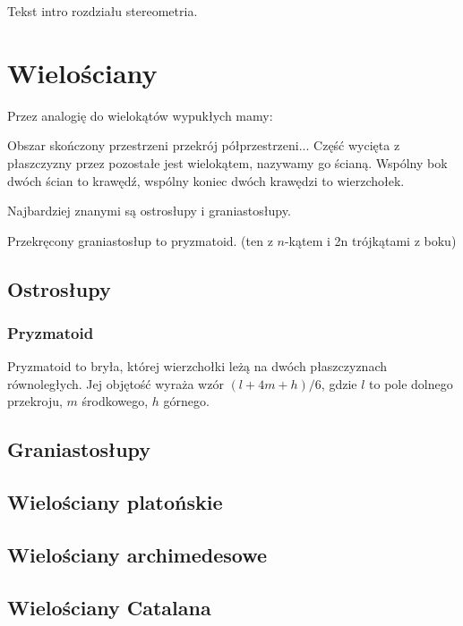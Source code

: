 
Tekst intro rozdziału stereometria.

\section{Wielościany}

Przez analogię do wielokątów wypukłych mamy:

\begin{definition}
    Obszar skończony przestrzeni przekrój półprzestrzeni...
    Część wycięta z płaszczyzny przez pozostałe jest wielokątem, nazywamy go ścianą.
    Wspólny bok dwóch ścian to krawędź, wspólny koniec dwóch krawędzi to wierzchołek.
\end{definition}

Najbardziej znanymi są ostrosłupy i graniastosłupy.

Przekręcony graniastosłup to pryzmatoid. (ten z $n$-kątem i 2n trójkątami z boku)

\subsection{Ostrosłupy}


\subsubsection{Pryzmatoid}
Pryzmatoid to bryła, której wierzchołki leżą na dwóch płaszczyznach równoległych.
Jej objętość wyraża wzór $(l + 4m + h)/ 6$, gdzie $l$ to pole dolnego przekroju, $m$ środkowego, $h$ górnego. %


\subsection{Graniastosłupy}

\subsection{Wielościany platońskie}


\subsection{Wielościany archimedesowe}


\subsection{Wielościany Catalana}


